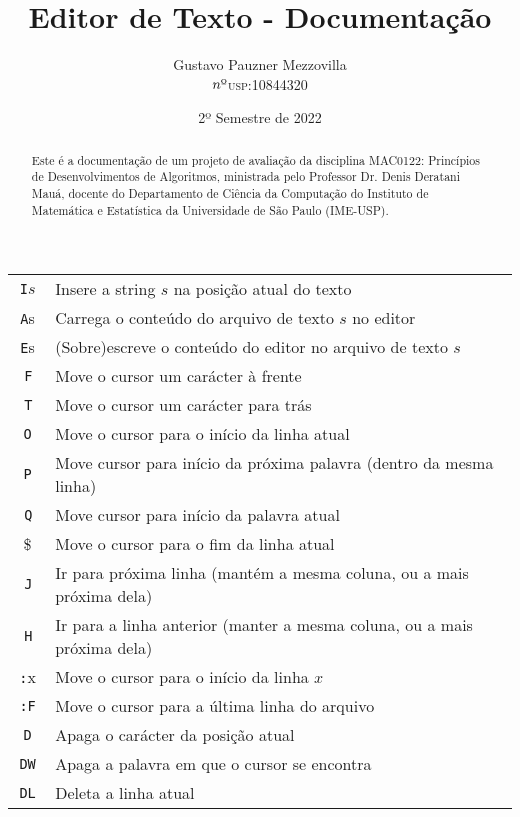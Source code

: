 \documentclass[a4paper, 11pt]{article}
\title{\textbf{Editor de Texto - Documentação}}
\author{Gustavo Pauzner Mezzovilla\\ \texorpdfstring{$n{\text{\textordmasculine}}$}{nº}\textsc{usp}:10844320}
\date{2º Semestre de 2022}
\begin{document}
\maketitle

\begin{abstract}
	Este é a documentação de um projeto de avaliação da disciplina \textsc{MAC0122}: Princípios de Desenvolvimentos de Algoritmos, ministrada pelo Professor Dr. Denis Deratani Mauá, docente do Departamento de Ciência da Computação do Instituto de Matemática e Estatística da Universidade de São Paulo (IME-USP). 
\end{abstract}

\begin{table}[H]
      \centering
      \begin{tabularx}{\linewidth}{|c|X|}
      \hline \texttt {I}$s$ & Insere a string $s$ na posição atual do texto  \\
      \texttt {A}s &  Carrega o conteúdo do arquivo de texto $s$ no editor \\
      \texttt{E}s &  (Sobre)escreve o conteúdo do editor no arquivo de texto $s$ \\
      \texttt{ F } &  Move o cursor um carácter à frente \\
      \texttt{ T } &  Move o cursor um carácter para trás \\
      \texttt{O} &  Move o cursor para o início da linha atual \\
      \texttt{P} &  Move cursor para início da próxima palavra (dentro da mesma linha) \\
      \texttt{ Q } &  Move cursor para início da palavra atual \\
      \$ &  Move o cursor para o fim da linha atual \\
      \texttt{ J } &  Ir para próxima linha (mantém a mesma coluna, ou a mais próxima dela) \\
      \texttt{ H } &  Ir para a linha anterior (manter a mesma coluna, ou a mais próxima dela) \\
      \texttt{:}x &  Move o cursor para o início da linha $x$ \\
      \texttt{:F} &  Move o cursor para a última linha do arquivo\\
      \texttt{D} &  Apaga o carácter da posição atual\\
      \texttt{DW} &  Apaga a palavra em que o cursor se encontra\\
      \texttt{DL} &  Deleta a linha atual\\

\end{tabularx}
\end{table}
\end{document}
